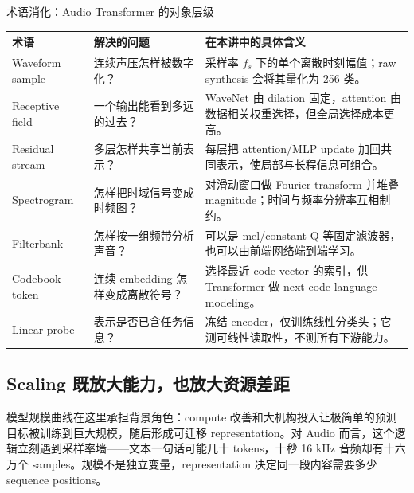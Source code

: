 
\begin{knowledgebox}{术语消化：Audio Transformer 的对象层级}
\small
\begin{tabularx}{\textwidth}{L{0.20\textwidth}L{0.27\textwidth}X}
\toprule
术语 & 解决的问题 & 在本讲中的具体含义 \\
\midrule
Waveform sample & 连续声压怎样被数字化？ & 采样率 $f_s$ 下的单个离散时刻幅值；raw synthesis 会将其量化为 256 类。 \\
Receptive field & 一个输出能看到多远的过去？ & WaveNet 由 dilation 固定，attention 由数据相关权重选择，但全局选择成本更高。 \\
Residual stream & 多层怎样共享当前表示？ & 每层把 attention/MLP update 加回共同表示，使局部与长程信息可组合。 \\
Spectrogram & 怎样把时域信号变成时频图？ & 对滑动窗口做 Fourier transform 并堆叠 magnitude；时间与频率分辨率互相制约。 \\
Filterbank & 怎样按一组频带分析声音？ & 可以是 mel/constant-Q 等固定滤波器，也可以由前端网络端到端学习。 \\
Codebook token & 连续 embedding 怎样变成离散符号？ & 选择最近 code vector 的索引，供 Transformer 做 next-code language modeling。 \\
Linear probe & 表示是否已含任务信息？ & 冻结 encoder，仅训练线性分类头；它测可线性读取性，不测所有下游能力。 \\
\bottomrule
\end{tabularx}
\end{knowledgebox}


\subsection{Scaling 既放大能力，也放大资源差距}

模型规模曲线在这里承担背景角色：compute 改善和大机构投入让极简单的预测目标被训练到巨大规模，随后形成可迁移 representation。对 Audio 而言，这个逻辑立刻遇到采样率墙——文本一句话可能几十 tokens，十秒 16 kHz 音频却有十六万个 samples。规模不是独立变量，representation 决定同一段内容需要多少 sequence positions。


